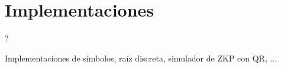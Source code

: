 \chapter{Implementaciones}\label{ch:implementaciones} 

?

Implementaciones de símbolos, raíz discreta, simulador de ZKP con QR, ...
